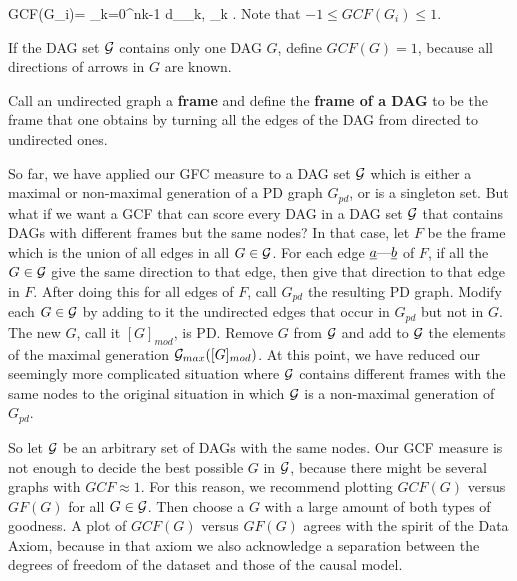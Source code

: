 \documentclass[12pt]{article}
\begin{document}
\beq
GCF(G_i)= 
{
\sum_{k=0}^{nk-1}
d_{\rva_k, \rvb_k}
}
\;.
\label{eq-rel-gfc}
\eeq
Note that
$-1\leq GCF(G_i)  \leq 1$.

If the DAG set ${\cal G}$ 
contains only one DAG $G$,
define $GCF(G)=1$, because all
directions of 
arrows in $G$ are known.

Call an undirected graph a {\bf frame}
and define the
{\bf frame of a DAG}
to be the frame that one obtains
by turning
all the edges of the DAG from directed 
to undirected ones.

So far, we 
have applied our GFC measure
 to a DAG set ${\cal G}$
which is
either a maximal or 
non-maximal generation
of  a PD graph $G_{pd}$,
or is a singleton set.
But what if we want a GCF
that can score every DAG
in a  DAG set
${\cal G}$ that contains
DAGs with different frames
but the same nodes?
In that case, 
let $F$
be the frame
which 
is the union of 
all edges in all $G\in {\cal G}$.
For each edge ${\underline{a}}\text{---}{\underline{b}}$ of $F$,
if all the $G\in {\cal G}$
give the same direction
to that edge, then give that direction
to that edge in $F$.
After doing this for
all edges of $F$,
call $G_{pd} $ the resulting 
PD graph.
Modify each $G\in {\cal G}$
by adding to it the undirected edges
that occur in $G_{pd}$
but not in $G$.
The new $G$, call it $[G]_{mod}$,
is PD. Remove $G$ from ${\cal G}$
and add to ${\cal G}$
the elements of
the maximal generation ${\cal G}_{max}([G]_{mod})$.
At this point,
we have reduced our
seemingly more 
complicated situation
where ${\cal G}$ contains
different frames with the same nodes
to the original situation
in which ${\cal G}$
is a non-maximal 
generation of $G_{pd}$.



So let ${\cal G}$
be an arbitrary set of
DAGs with the same nodes.
Our GCF  measure
is not enough to
decide the best 
possible $G$ in ${\cal G}$,
because there might 
be several graphs with 
$GCF\approx 1$.
For this reason,
we recommend
plotting $GCF(G)$ 
versus $GF(G)$
for all $G\in{\cal G}$.
Then  choose a $G$ with a
large amount
of both types of goodness.
A plot of 
$GCF(G)$
versus $GF(G)$
agrees with the spirit of
the Data 
Axiom,
because in that axiom 
we also acknowledge a separation between the
degrees of freedom of the
dataset  and 
those of the causal model.



\end{document}
